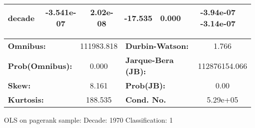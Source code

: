 \begin{center}
\begin{tabular}{lccccc}
\textbf{decade}             &   -3.541e-07  &     2.02e-08     &   -17.535  &         0.000        &     -3.94e-07 -3.14e-07       \\
\bottomrule
\end{tabular}
\begin{tabular}{lclc}
\textbf{Omnibus:}       & 111983.818 & \textbf{  Durbin-Watson:     } &       1.766    \\
\textbf{Prob(Omnibus):} &    0.000   & \textbf{  Jarque-Bera (JB):  } & 112876154.066  \\
\textbf{Skew:}          &    8.161   & \textbf{  Prob(JB):          } &        0.00    \\
\textbf{Kurtosis:}      &  188.535   & \textbf{  Cond. No.          } &    5.29e+05    \\
\bottomrule
\end{tabular}
\end{center}
\break
OLS on pagerank sample: Decade: 1970 Classification: 1
